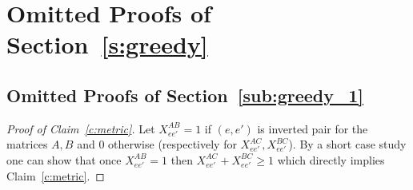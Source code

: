 \section{Omitted Proofs of Section~\ref{s:greedy}}\label{s:greedy_appendix}

\subsection{Omitted Proofs of Section~\ref{sub:greedy_1}}

\begin{proof}[Proof of Claim~\ref{c:metric}]
Let $X_{ee'}^{AB} = 1$ if $(e,e')$ is inverted pair for the matrices $A,B$ and $0$ otherwise (respectively for $X_{ee'}^{AC},X_{ee'}^{BC}$). By a short case study one can show that once $X_{ee'}^{AB} = 1$ then
$X_{ee'}^{AC} + X_{ee'}^{BC} \geq 1$ which directly implies Claim~\ref{c:metric}.
\end{proof}

